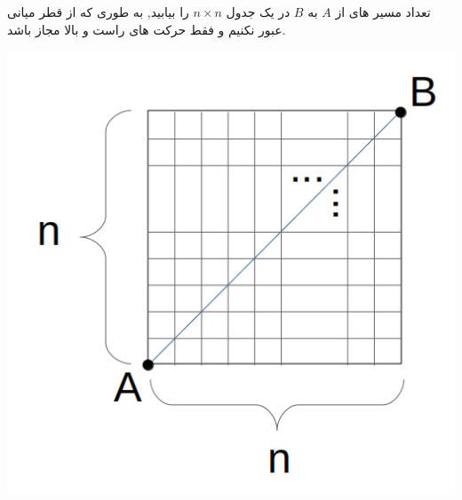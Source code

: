 \begin{PROBLEM}
    تعداد مسیر های از
    $A$
    به
    $B$
    در یک جدول
    $n\times n$
    را بیابید, به طوری که از قطر میانی عبور نکنیم و فقط حرکت های راست و بالا مجاز باشد.
    \begin{center}
    \includegraphics[totalheight=6cm]{ex2im1.png}
    \end{center}
    \SOLUTION{
    
    }
\end{PROBLEM}
